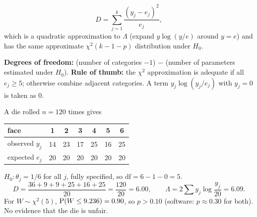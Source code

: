 \begin{definition}
\[
D = \sum_{j=1}^k\frac{(y_j-e_j)^2}{e_j},
\]
which is a quadratic approximation to $\Lambda$ (expand $y\log(y/e)$ around $y=e$) and has
the same approximate $\chi^2(k-1-p)$ distribution under $H_0$.
\end{definition}

\textbf{Degrees of freedom:} (number of categories $-1$) $-$ (number of parameters
estimated under $H_0$).
\textbf{Rule of thumb:} the $\chi^2$ approximation is adequate if all $e_j\ge 5$;
otherwise combine adjacent categories. A term $y_j\log(y_j/e_j)$ with $y_j=0$ is
taken as $0$.

\begin{example}[Is the die fair? ($p=0$)]
A die rolled $n=120$ times gives
\begin{center}
\begin{tabular}{lcccccc}
\toprule
face & 1&2&3&4&5&6\\
\midrule
observed $y_j$ & 14 & 23 & 17 & 25 & 16 & 25\\
expected $e_j$ & 20&20&20&20&20&20\\
\bottomrule
\end{tabular}
\end{center}
$H_0:\theta_j = 1/6$ for all $j$, fully specified, so $\text{df} = 6-1-0 = 5$.
\[
D = \frac{36 + 9 + 9 + 25 + 16 + 25}{20} = \frac{120}{20} = 6.00,\qquad
\Lambda = 2\sum y_j\log\frac{y_j}{20} = 6.09.
\]
For $W\sim\chi^2(5)$, $\operatorname{P}(W\le 9.236) = 0.90$, so $p>0.10$ (software: $p\approx 0.30$
for both). No evidence that the die is unfair.
\end{example}

